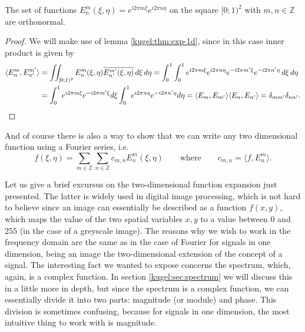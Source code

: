 \begin{lemma}
  The set of functions \(E^m_n(\xi, \eta) = e^{i2\pi m\xi}e^{i2\pi n\eta}\)
  on the square \([0; 1)^2\) with \(m, n \in \mathbb{Z} \) are orthonormal.
\end{lemma}
\begin{proof}
  We will make use of lemma \ref{kugel:thm:exp-1d}, since in this case inner
  product is given by
  \begin{align*}
    \langle E^m_n, E^{m'}_{n'} \rangle
    &= \iint_{[0;1)^2}
        E^m_n(\xi, \eta) \overline{E^{m'}_{n'} (\xi, \eta)}
      \, d\xi \, d\eta
    = \int_0^1 \int_0^1
        e^{i2\pi m\xi} e^{i2\pi n\eta}
        e^{-i2\pi m'\xi} e^{-i2\pi n'\eta}
      \, d\xi \, d\eta
      \\
    &= \int_0^1 e^{i2\pi m\xi} e^{-i2\pi m'\xi} d\xi 
      \int_0^1 e^{i2\pi n\eta} e^{-i2\pi n'\eta} d\eta
    = \langle E_m, E_{m'} \rangle \langle E_n, E_{n'} \rangle
    = \delta_{mm'} \delta_{nn'}
    .\qedhere
  \end{align*}
\end{proof}

And of course there is also a way to show that we can write any two
dimensional function using a Fourier series, i.e.
\begin{equation*}
  f(\xi, \eta) = \sum_{m \in \mathbb{Z}} \sum_{n \in \mathbb{Z}}
    c_{m, n} E^m_n(\xi, \eta)
    \qquad\text{where}\qquad
    c_{m,n} = \langle f, E^m_n \rangle.
\end{equation*}

Let us give a brief excursus on the two-dimensional function expansion just
presented. The latter is widely used in digital image processing, which is not
hard to believe since an image can essentially be described as a function
$f(x,y)$, which maps the value of the two spatial variables $x,y$ to a value
between 0 and 255 (in the case of a greyscale image). The reasons why we wish
to work in the frequency domain are the same as in the case of Fourier for
signals in one dimension, being an image the two-dimensional extension of the
concept of a signal. The interesting fact we wanted to expose concerns the
spectrum, which, again, is a complex function. In section
\ref{kugel:sec:spectrum} we will discuss this in a little more in depth, but
since the spectrum is a complex function, we can essentially divide it into
two parts: magnitude (or module) and phase. This division is sometimes
confusing, because for signals in one dimension, the most intuitive thing to
work with is magnitude.

